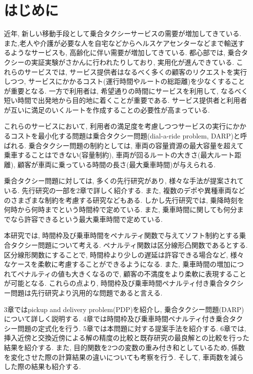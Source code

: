 \chapter{はじめに}
近年, 新しい移動手段として乗合タクシーサービスの需要が増加してきている. また,老人や介護が必要な人を自宅などからヘルスケアセンターなどまで輸送するようなサービスも, 高齢化に伴い需要が増加してきている.
都心部では, 乗合タクシーの実証実験がさかんに行われたりしており, 実用化が進んできている. これらのサービスでは, サービス提供者はなるべく多くの顧客のリクエストを実行しつつ, サービスにかかるコスト(運行時間やルートの総距離)を少なくすることが重要となる. 一方で利用者は, 希望通りの時間にサービスを利用して, なるべく短い時間で出発地から目的地に着くことが重要である. サービス提供者と利用者が互いに満足のいくルートを作成することの必要性が高まっている.

これらのサービスにおいて, 利用者の満足度を考慮しつつサービスの実行にかかるコストを最小化する問題は乗合タクシー問題(dial-a-ride problem, DARP)と呼ばれる.
乗合タクシー問題の制約としては, 車両の容量資源の最大容量を超えて乗車することはできない(容量制約), 車両が回るルートの大きさ(最大ルート距離), 顧客が車両に乗っている時間の長さ(最大乗車時間)が与えられる.

乗合タクシー問題に対しては, 多くの先行研究があり, 様々な手法が提案されている. 先行研究の一部を2章で詳しく紹介する. また, 複数のデポや異種車両などのさまざまな制約を考慮する研究などもある. しかし先行研究では, 乗降時刻を何時から何時までという時間枠で定めている. また, 乗車時間に関しても何分までなら許容できるという最大乗車時間で定めている.

本研究では, 時間枠及び乗車時間をペナルティ関数で与えてソフト制約とする乗合タクシー問題について考える. ペナルティ関数は区分線形凸関数であるとする. 区分線形関数にすることで, 時間枠より少しの遅延は許容できる場合など, 様々なケースを柔軟に考慮することができるようになる. また, 乗車時間の増加につれてペナルティの値も大きくなるので, 顧客の不満度をより柔軟に表現することが可能となる. これらの点より, 時間枠及び乗車時間ペナルティ付き乗合タクシー問題は先行研究より汎用的な問題であると言える.

3章ではpickup and delivery problem(PDP)を紹介し, 乗合タクシー問題(DARP)について詳しく説明する. 4章では時間枠及び乗車時間ペナルティ付き乗合タクシー問題の定式化を行う. 5章では本問題に対する提案手法を紹介する.
6章では, 挿入近傍と交換近傍による解の精度の比較と既存研究の最良解との比較を行った結果を紹介する. また, 目的関数を2つの変数の重み付き和としているため, 係数を変化させた際の計算結果の違いについても考察を行う. そして, 車両数を減らした際の結果も紹介する.
